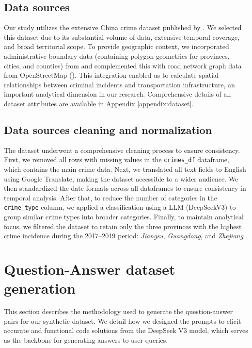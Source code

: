 \subsection{Data sources}

Our study utilizes the extensive China crime dataset published by \cite{Zhang2025CrimeDatasetChina}. We selected this dataset due to its substantial volume of data, extensive temporal coverage, and broad territorial scope. To provide geographic context, we incorporated administrative boundary data (containing polygon geometries for provinces, cities, and counties) from \cite{GeoJSON2025China} and complemented this with road network graph data from OpenStreetMap (\cite{Vargas2021OSM}). This integration enabled us to calculate spatial relationships between criminal incidents and transportation infrastructure, an important analytical dimension in our research. Comprehensive details of all dataset attributes are available in Appendix \ref{appendix:dataset}.

\subsection{Data sources cleaning and normalization}

The dataset underwent a comprehensive cleaning process to ensure consistency. First, we removed all rows with missing values in the \texttt{crimes\_df} dataframe, which contains the main crime data. Next, we translated all text fields to English using Google Translate, making the dataset accessible to a wider audience. We then standardized the date formats across all dataframes to ensure consistency in temporal analysis. After that, to reduce the number of categories in the \texttt{crime\_type} column, we applied a classification using a LLM (DeepSeekV3) to group similar crime types into broader categories. Finally, to maintain analytical focus, we filtered the dataset to retain only the three provinces with the highest crime incidence during the 2017–2019 period: \textit{Jiangsu}, \textit{Guangdong}, and \textit{Zhejiang}.

\section{Question-Answer dataset generation}

This section describes the methodology used to generate the question-answer pairs for our synthetic dataset. We detail how we designed the prompts to elicit accurate and functional code solutions from the DeepSeek V3 model, which serves as the backbone for generating answers to user queries.

